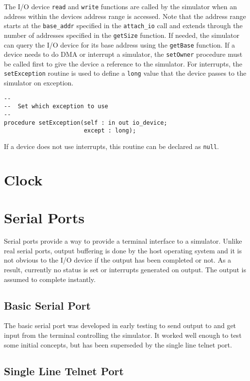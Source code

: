 \documentclass[10pt, openany]{book}
\begin{document}
The I/O device \verb|read| and \verb|write| functions are called by the simulator when an address within the devices address range is accessed.  Note that the address range starts at the \verb|base_addr| specified in the \verb|attach_io| call and extends through the number of addresses specified in the \verb|getSize| function.  If needed, the simulator can query the I/O device for its base address using the \verb|getBase| function.  If a device needs to do DMA or interrupt a simulator, the \verb|setOwner| procedure must be called first to give the device a reference to the simulator.  For interrupts, the \verb|setException| routine is used to define a \verb|long| value that the device passes to the simulator on exception.
\begin{lstlisting}
--
--  Set which exception to use
--
procedure setException(self : in out io_device;
                       except : long);
\end{lstlisting}

If a device does not use interrupts, this routine can be declared as \verb|null|.

\section{Clock}
\section{Serial Ports}
Serial ports provide a way to provide a terminal interface to a simulator.  Unlike real serial ports, output buffering is done by the host operating system and it is not obvious to the I/O device if the output has been completed or not.  As a result, currently no status is set or interrupts generated on output.  The output is assumed to complete instantly.

\subsection{Basic Serial Port}
The basic serial port was developed in early testing to send output to and get input from the terminal controlling the simulator.  It worked well enough to test some initial concepts, but has been superseded by the single line telnet port.
\subsection{Single Line Telnet Port}
\end{document}
